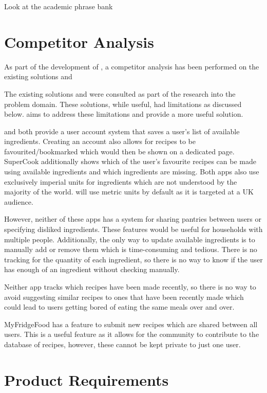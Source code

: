 {    Look at the academic phrase bank
}

\section{Competitor Analysis}
\label{sec:competitor_analysis}
As part of the development of \chef{}, a competitor analysis has been performed on the existing solutions \cite{myfridgefood_myfridgefood_nodate} and \cite{supercook_supercook_nodate}

The existing solutions \cite{myfridgefood_myfridgefood_nodate} and \cite{supercook_supercook_nodate} were consulted
as part of the research into the problem domain. These solutions, while useful, had limitations as discussed below.
\chef{} aims to address these limitations and provide a more useful solution.

\cite{myfridgefood_myfridgefood_nodate} and \cite{supercook_supercook_nodate} both provide a user account system
that saves a user's list of available ingredients. Creating an account also allows for recipes to be favourited/bookmarked
which would then be shown on a dedicated page. SuperCook additionally shows which of the user's favourite recipes
can be made using available ingredients and which ingredients are missing. Both apps also use exclusively imperial
units for ingredients which are not understood by the majority of the world. \chef{} will use metric units by default
as it is targeted at a UK audience.

However, neither of these apps has a system for sharing pantries between users or specifying disliked ingredients. These features would be useful for households with multiple people.
Additionally, the only way to update available ingredients is to manually add or remove them which is time-consuming and tedious. There is no tracking for the quantity of
each ingredient, so there is no way to know if the user has enough of an ingredient without checking manually.

Neither app tracks which recipes have been made recently, so there is no way to avoid suggesting similar recipes to ones that have been recently made which could lead to
users getting bored of eating the same meals over and over.

MyFridgeFood has a feature to submit new recipes which are shared between all users. This is a useful feature as it allows for the community to contribute to the database
of recipes, however, these cannot be kept private to just one user.

\section{Product Requirements}

